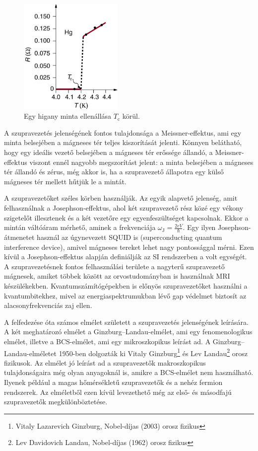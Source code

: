 \documentclass[a4paper,12pt,titlepage]{article}
\begin{document}
\begin{figure}[h!]
	\centering
	\includegraphics[width=5cm]{higany_R-vs-T.jpg}
	\caption{Egy higany minta ellenállása $T_\text{c}$ körül. \cite{openstax}}
\end{figure}

A szupravezetés jelenségének fontos tulajdonsága a Meissner-effektus, ami egy minta belsejében a mágneses tér teljes kiszorítását jelenti.  Könnyen belátható, hogy egy ideális vezető belsejében a mágneses tér erőssége állandó, a Meissner-effektus viszont ennél nagyobb megszorítást jelent: a minta belsejében a mágneses tér állandó és zérus, még akkor is, ha a szupravezető állapotra egy külső mágneses tér mellett hűtjük le a mintát.

A szupravezetőket széles körben használják.  Az egyik alapvető jelenség, amit felhasználnak a Josephson-effektus, ahol két szupravezető rész közé egy vékony szigetelőt illesztenek és a két vezetőre egy egyenfeszültséget kapcsolnak.  Ekkor a mintán váltóáram mérhető, aminek a frekvenciája $\omega_\text{J} = \frac{2e V}{\hbar}$.  Egy ilyen Josephson-átmenetet használ az úgynevezett SQUID is (superconducting quantum interference device), amivel mágneses tereket lehet nagy pontossággal mérni.  Ezen kívül a Josephson-effektus alapján definiálják az SI rendszerben a volt egységét.  A szupravezetésnek fontos felhasználási területe a nagyterű szupravezető mágnesek, amiket többek között az orvostudományban is használnak MRI készülékekben.  Kvantumszámítógépekben is előnyös szupravezetőket használni a kvantumbitekhez, mivel az energiaspektrumukban lévő gap védelmet biztosít az alacsonyfrekvenciás zaj ellen.

A felfedezése óta számos elmélet született a szupravezetés jelenségének leírására.  A két meghatározó elmélet a Ginzburg--Landau-elmélet, ami egy fenomenologikus elmélet, illetve a BCS-elmélet, ami egy mikroszkopikus leírást ad.
A Ginzburg--Landau-elméletet 1950-ben dolgozták ki Vitaly Ginzburg\footnote{Vitaly Lazarevich Ginzburg, Nobel-díjas (2003) orosz fizikus} és Lev Landau\footnote{Lev Davidovich Landau, Nobel-díjas (1962) orosz fizikus} orosz fizikusok.  Az elmélet jó leírást ad a szupravezetők makroszkopikus tulajdonságaira még olyan anyagoknál is, amikre a BCS-elmélet nem használható.  Ilyenek például a magas hőmérsékletű szupravezetők és a nehéz fermion rendszerek.  Az elméletből ezen kívül levezethető még az első- és másodfajú szupravezetők megkülönböztetése.
\end{document}
